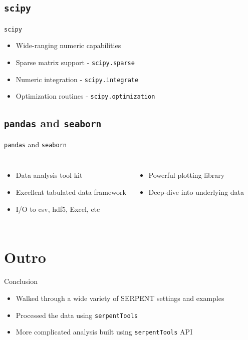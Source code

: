 \documentclass{beamer}
\newcommand{\st}{\texttt{serpentTools} }
\begin{document}
\subsection{\texttt{scipy}}

\begin{frame}{\texttt{scipy}}
    \begin{itemize}
        \item{Wide-ranging numeric capabilities}
        \item{Sparse matrix support - \texttt{scipy.sparse}}
        \item{Numeric integration - \texttt{scipy.integrate}}
        \item{Optimization routines - \texttt{scipy.optimization}}
    \end{itemize}
\end{frame}

\subsection{\texttt{pandas} and \texttt{seaborn}}
\begin{frame}{\texttt{pandas} and \texttt{seaborn}}
    \begin{columns}
        \begin{itemize}
            \item{Data analysis tool kit}
            \item{Excellent tabulated data framework}
            \item{I/O to csv, hdf5, Excel, etc}
        \end{itemize}

        \begin{itemize}
            \item{Powerful plotting library}
            \item{Deep-dive into underlying data}
        \end{itemize}
    \end{columns}
\end{frame}


\section*{Outro}

\begin{frame}{Conclusion}
    \begin{itemize}
        \item Walked through a wide variety of SERPENT settings and examples
        \item Processed the data using \st
        \item More complicated analysis built using \st API
    \end{itemize}
\end{frame}
\end{document}
